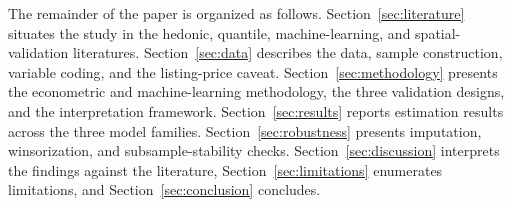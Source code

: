 The remainder of the paper is organized as follows.
Section~\ref{sec:literature} situates the study in the hedonic, quantile,
machine-learning, and spatial-validation literatures.
Section~\ref{sec:data} describes the data, sample construction, variable coding,
and the listing-price caveat. Section~\ref{sec:methodology} presents the
econometric and machine-learning methodology, the three validation designs, and
the interpretation framework. Section~\ref{sec:results} reports estimation
results across the three model families. Section~\ref{sec:robustness} presents
imputation, winsorization, and subsample-stability checks.
Section~\ref{sec:discussion} interprets the findings against the literature,
Section~\ref{sec:limitations} enumerates limitations, and
Section~\ref{sec:conclusion} concludes.
